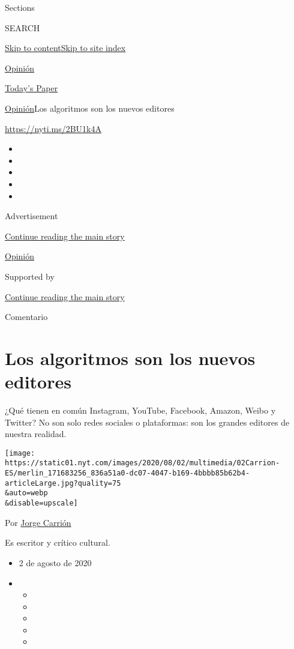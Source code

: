 Sections

SEARCH

\protect\hyperlink{site-content}{Skip to
content}\protect\hyperlink{site-index}{Skip to site index}

\href{https://www.nytimes.com/es/section/opinion}{Opinión}

\href{https://myaccount.nytimes.com/auth/login?response_type=cookie\&client_id=vi}{}

\href{https://www.nytimes.com/section/todayspaper}{Today's Paper}

\href{/es/section/opinion}{Opinión}\textbar{}Los algoritmos son los
nuevos editores

\url{https://nyti.ms/2BU1k4A}

\begin{itemize}
\item
\item
\item
\item
\item
\end{itemize}

Advertisement

\protect\hyperlink{after-top}{Continue reading the main story}

\href{/es/section/opinion}{Opinión}

Supported by

\protect\hyperlink{after-sponsor}{Continue reading the main story}

Comentario

\hypertarget{los-algoritmos-son-los-nuevos-editores}{%
\section{Los algoritmos son los nuevos
editores}\label{los-algoritmos-son-los-nuevos-editores}}

¿Qué tienen en común Instagram, YouTube, Facebook, Amazon, Weibo y
Twitter? No son solo redes sociales o plataformas: son los grandes
editores de nuestra realidad.

\texttt{[image: https://static01.nyt.com/images/2020/08/02/multimedia/02Carrion-ES/merlin\_171683256\_836a51a0-dc07-4047-b169-4bbbb85b62b4-articleLarge.jpg?quality=75\\\&auto=webp\\\&disable=upscale]}

Por \href{https://www.nytimes.com/by/jorge-carrion}{Jorge Carrión}

Es escritor y crítico cultural.

\begin{itemize}
\item
  2 de agosto de 2020
\item
  \begin{itemize}
  \item
  \item
  \item
  \item
  \item
  \end{itemize}
\end{itemize}

